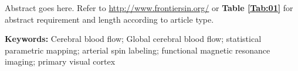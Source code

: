 Abstract goes here.
Refer to  \url{http://www.frontiersin.org/} or \textbf{Table \ref{Tab:01}} for abstract requirement and length according to article type.


\textbf{Keywords:} Cerebral blood flow; Global cerebral blood flow; statistical parametric mapping; arterial spin labeling; functional magnetic resonance imaging; primary visual cortex
